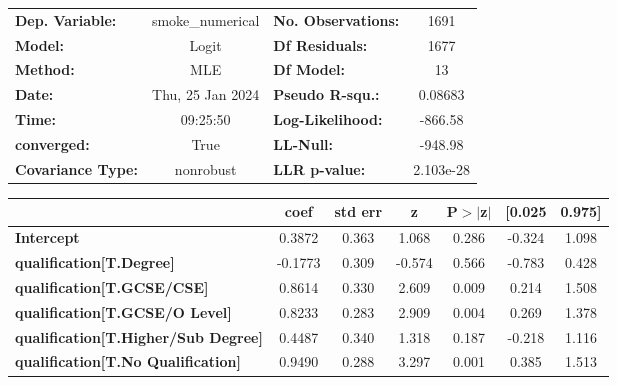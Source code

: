 \begin{center}
\begin{tabular}{lclc}
\toprule
\textbf{Dep. Variable:}                     & smoke\_numerical & \textbf{  No. Observations:  } &     1691    \\
\textbf{Model:}                             &      Logit       & \textbf{  Df Residuals:      } &     1677    \\
\textbf{Method:}                            &       MLE        & \textbf{  Df Model:          } &       13    \\
\textbf{Date:}                              & Thu, 25 Jan 2024 & \textbf{  Pseudo R-squ.:     } &  0.08683    \\
\textbf{Time:}                              &     09:25:50     & \textbf{  Log-Likelihood:    } &   -866.58   \\
\textbf{converged:}                         &       True       & \textbf{  LL-Null:           } &   -948.98   \\
\textbf{Covariance Type:}                   &    nonrobust     & \textbf{  LLR p-value:       } & 2.103e-28   \\
\bottomrule
\end{tabular}
\begin{tabular}{lcccccc}
                                            & \textbf{coef} & \textbf{std err} & \textbf{z} & \textbf{P$> |$z$|$} & \textbf{[0.025} & \textbf{0.975]}  \\
\midrule
\textbf{Intercept}                          &       0.3872  &        0.363     &     1.068  &         0.286        &       -0.324    &        1.098     \\
\textbf{qualification[T.Degree]}            &      -0.1773  &        0.309     &    -0.574  &         0.566        &       -0.783    &        0.428     \\
\textbf{qualification[T.GCSE/CSE]}          &       0.8614  &        0.330     &     2.609  &         0.009        &        0.214    &        1.508     \\
\textbf{qualification[T.GCSE/O Level]}      &       0.8233  &        0.283     &     2.909  &         0.004        &        0.269    &        1.378     \\
\textbf{qualification[T.Higher/Sub Degree]} &       0.4487  &        0.340     &     1.318  &         0.187        &       -0.218    &        1.116     \\
\textbf{qualification[T.No Qualification]}  &       0.9490  &        0.288     &     3.297  &         0.001        &        0.385    &        1.513     \\

\end{tabular}
\end{center}
